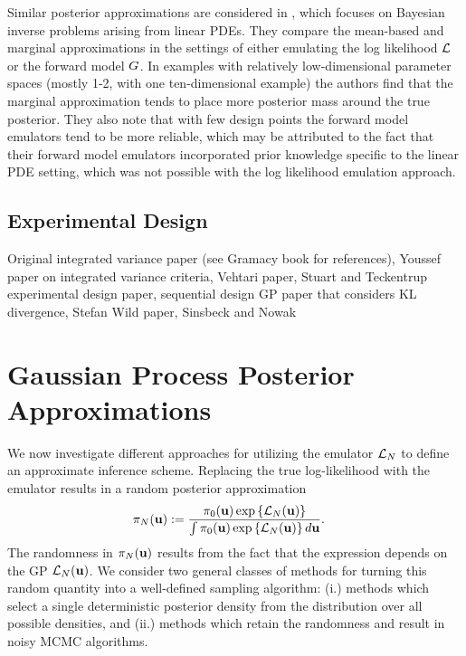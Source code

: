 \documentclass[12pt]{article}
\begin{document}
Similar posterior approximations are considered in \cite{GP_PDE_priors}, which focuses on Bayesian inverse problems arising from linear PDEs. They 
compare the mean-based and marginal approximations in the settings of either emulating the log likelihood $\mathcal{L}$ or the forward model $G$. In examples 
with relatively low-dimensional parameter spaces (mostly 1-2, with one ten-dimensional example) the authors find that the marginal approximation tends to 
place more posterior mass around the true posterior. They also note that with few design points the forward model emulators tend to be more reliable, which 
may be attributed to the fact that their forward model emulators incorporated prior knowledge specific to the linear PDE setting, which was not possible with 
the log likelihood emulation approach. 

\subsection{Experimental Design}
Original integrated variance paper (see Gramacy book for references), Youssef paper on integrated variance criteria, Vehtari paper, Stuart and Teckentrup experimental 
design paper, sequential design GP paper that considers KL divergence, Stefan Wild paper, Sinsbeck and Nowak 

\section{Gaussian Process Posterior Approximations}
We now investigate different approaches for utilizing the emulator $\mathcal{L}_{N}$ to define an approximate inference scheme. Replacing the true log-likelihood 
with the emulator results in a random posterior approximation 
\begin{align}
\pi_{N}(\mathbf{u})
&:= \frac{\pi_0(\mathbf{u}) \exp\left\{\mathcal{L}_{N}(\mathbf{u}) \right\}}{\int \pi_0(\mathbf{u}) \exp\left\{\mathcal{L}_{N}(\mathbf{u}) \right\} d\mathbf{u}}.
\end{align}
The randomness in $\pi_{N}(\mathbf{u})$ results from the fact that the expression depends on the GP $\mathcal{L}_{N}(\mathbf{u})$. We consider 
two general classes of methods for turning this random quantity into a well-defined sampling algorithm: (i.) methods which select a single deterministic 
posterior density from the distribution over all possible densities, and (ii.) methods which retain the randomness and result in noisy MCMC algorithms. 
\end{document}

